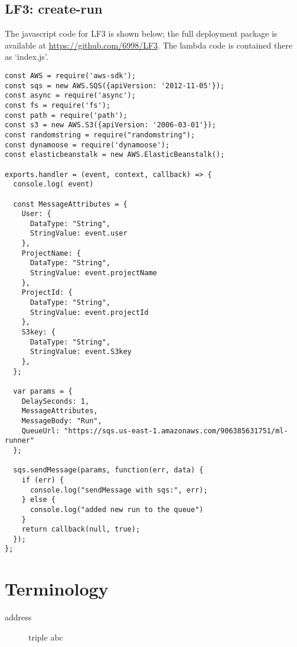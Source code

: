 \documentclass[12pt,oneside]{amsart}
\begin{document}
\subsection{LF3: create-run} \label{code:lf3}
The javascript code for LF3 is shown below; the full deployment package is available at \url{https://github.com/6998/LF3}.
The lambda code is contained there as `index.js'.

\begin{Verbatim}[fontsize=\tiny, frame=single]
const AWS = require('aws-sdk');
const sqs = new AWS.SQS({apiVersion: '2012-11-05'});
const async = require('async');
const fs = require('fs');
const path = require('path');
const s3 = new AWS.S3({apiVersion: '2006-03-01'});
const randomstring = require("randomstring");
const dynamoose = require('dynamoose');
const elasticbeanstalk = new AWS.ElasticBeanstalk();

exports.handler = (event, context, callback) => {
  console.log( event)

  const MessageAttributes = {
    User: {
      DataType: "String",
      StringValue: event.user
    },
    ProjectName: {
      DataType: "String",
      StringValue: event.projectName
    },
    ProjectId: {
      DataType: "String",
      StringValue: event.projectId
    },
    S3key: {
      DataType: "String",
      StringValue: event.S3key
    },
  };

  var params = {
    DelaySeconds: 1,
    MessageAttributes,
    MessageBody: "Run",
    QueueUrl: "https://sqs.us-east-1.amazonaws.com/906385631751/ml-runner"
  };

  sqs.sendMessage(params, function(err, data) {
    if (err) {
      console.log("sendMessage with sqs:", err);
    } else {
      console.log("added new run to the queue")
    }
    return callback(null, true);
  });
};
\end{Verbatim}

\section{Terminology} \label{ch:Terminology}

\begin{description}
\item[address] triple abc
\end{description}

\appendix
\end{document}
